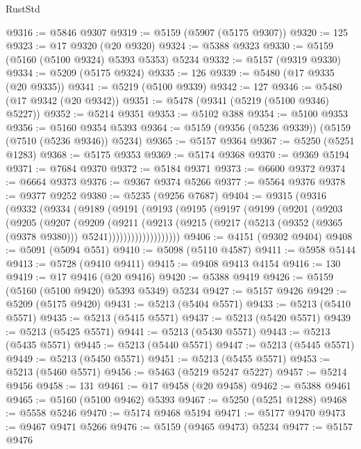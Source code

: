 \begin{lexlean}{RustStd}
\begin{coremodule}
@9316 := @5846 @9307
@9319 := @5159 (@5907 (@5175 @9307))
@9320 := 125
@9323 := @17 @9320 (@20 @9320)
@9324 := @5388 @9323
@9330 := @5159 (@5160 (@5100 @9324) @5393 @5353) @5234
@9332 := @5157 (@9319 @9330)
@9334 := @5209 (@5175 @9324)
@9335 := 126
@9339 := @5480 (@17 @9335 (@20 @9335))
@9341 := @5219 (@5100 @9339)
@9342 := 127
@9346 := @5480 (@17 @9342 (@20 @9342))
@9351 := @5478 (@9341 (@5219 (@5100 @9346) @5227))
@9352 := @5214 @9351
@9353 := @5102 @388
@9354 := @5100 @9353
@9356 := @5160 @9354 @5393
@9364 := @5159 (@9356 (@5236 @9339)) (@5159 (@7510 (@5236 @9346)) @5234)
@9365 := @5157 @9364
@9367 := @5250 (@5251 @1283)
@9368 := @5175 @9353
@9369 := @5174 @9368
@9370 := @9369 @5194
@9371 := @7684 @9370
@9372 := @5184 @9371
@9373 := @6600 @9372
@9374 := @6664 @9373
@9376 := @9367 @9374 @5266
@9377 := @5564 @9376
@9378 := @9377 @9252
@9380 := @5235 (@9256 @7687)
@9404 := @9315
    (@9316
      (@9332
        (@9334
          (@9189
            (@9191
              (@9193
                (@9195
                  (@9197
                    (@9199
                      (@9201
                        (@9203
                          (@9205
                            (@9207
                              (@9209
                                (@9211
                                  (@9213
                                    (@9215
                                      (@9217
                                        (@5213
                                          (@9352 (@9365 (@9378 @9380)))
                                          @5241)))))))))))))))))))
@9406 := @4151 (@9302 @9404)
@9408 := @5091 (@5094 @551)
@9410 := @5098 (@5110 @4587)
@9411 := @5958 @5144
@9413 := @5728 (@9410 @9411)
@9415 := @9408 @9413 @4154
@9416 := 130
@9419 := @17 @9416 (@20 @9416)
@9420 := @5388 @9419
@9426 := @5159 (@5160 (@5100 @9420) @5393 @5349) @5234
@9427 := @5157 @9426
@9429 := @5209 (@5175 @9420)
@9431 := @5213 (@5404 @5571)
@9433 := @5213 (@5410 @5571)
@9435 := @5213 (@5415 @5571)
@9437 := @5213 (@5420 @5571)
@9439 := @5213 (@5425 @5571)
@9441 := @5213 (@5430 @5571)
@9443 := @5213 (@5435 @5571)
@9445 := @5213 (@5440 @5571)
@9447 := @5213 (@5445 @5571)
@9449 := @5213 (@5450 @5571)
@9451 := @5213 (@5455 @5571)
@9453 := @5213 (@5460 @5571)
@9456 := @5463 (@5219 @5247 @5227)
@9457 := @5214 @9456
@9458 := 131
@9461 := @17 @9458 (@20 @9458)
@9462 := @5388 @9461
@9465 := @5160 (@5100 @9462) @5393
@9467 := @5250 (@5251 @1288)
@9468 := @5558 @5246
@9470 := @5174 @9468 @5194
@9471 := @5177 @9470
@9473 := @9467 @9471 @5266
@9476 := @5159 (@9465 @9473) @5234
@9477 := @5157 @9476

\end{coremodule}
\end{lexlean}

